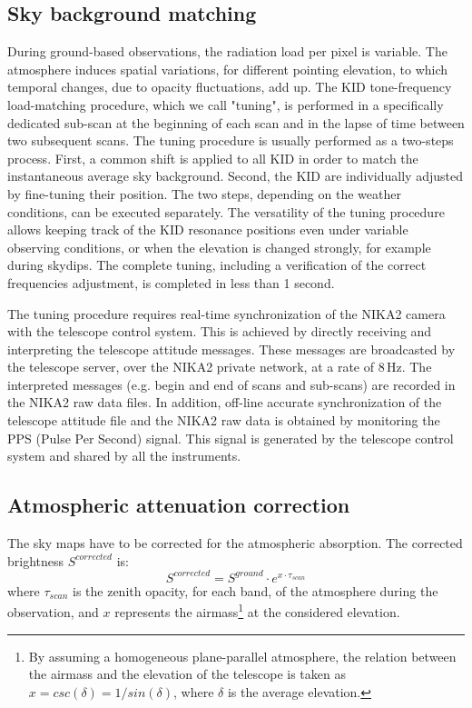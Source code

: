 \documentclass[]{aa} %
\begin{document}
\subsection{Sky background matching}
\label{Sky background matching}

During ground-based observations, the radiation load per pixel is variable. The atmosphere induces spatial variations, for different pointing elevation, to which temporal changes, due to opacity fluctuations, add up. The KID tone-frequency load-matching procedure, which we call "tuning", is performed in a specifically dedicated sub-scan at the beginning of each scan and in the lapse of time between two subsequent scans. The tuning procedure is usually performed as a two-steps process. First, a common shift is applied to all KID in order to match the instantaneous average sky background. Second, the KID are individually adjusted by fine-tuning their position. The two steps, depending on the weather conditions, can be executed separately. The versatility of the tuning procedure allows keeping track of the KID resonance positions even under variable observing conditions, or when the elevation is changed strongly, for example during skydips. The complete tuning, including a verification of the correct frequencies adjustment, is completed in less than 1 second. 

The tuning procedure requires real-time synchronization of the NIKA2 camera with the telescope control system. This is achieved by directly receiving and interpreting the telescope attitude messages. These messages are broadcasted by the telescope server, over the NIKA2 private network, at a rate of 8\,Hz. The interpreted messages (e.g. begin and end of scans and sub-scans) are recorded in the NIKA2 raw data files. In addition, off-line accurate synchronization of the telescope attitude file and the NIKA2 raw data is obtained by monitoring the PPS (Pulse Per Second) signal. This signal is generated by the telescope control system and shared by all the instruments.


\subsection{Atmospheric attenuation correction}
\label{Atmospheric attenuation correction}


The sky maps have to be corrected for the atmospheric absorption. The corrected brightness $S^{corrected}$ is:
\begin{equation}\label{eq:opa}
S^{corrected} =  S^{ground} \cdot e^{ x \cdot \tau_{scan}}
\end{equation}
where $\tau_{scan}$ is the zenith opacity, for each band, of the atmosphere during the
observation, and $x$ represents the airmass\footnote{By assuming a
  homogeneous plane-parallel atmosphere, the relation between the
  airmass and the elevation of the telescope is taken as $x =
  csc(\delta)=1/sin(\delta)$, where $\delta$ is the average
  elevation.} at the considered elevation.
\end{document}
